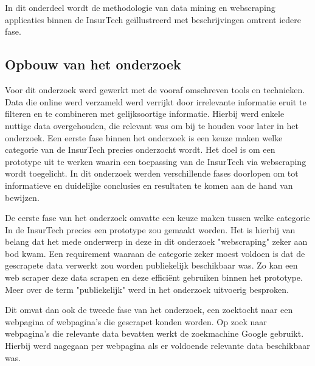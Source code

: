 
\chapter{}
\label{ch:methodologie}


In dit onderdeel wordt de methodologie van data mining en webscraping applicaties binnen de InsurTech geïllustreerd met beschrijvingen omtrent iedere fase.

\section{Opbouw van het onderzoek}
Voor dit onderzoek werd gewerkt met de vooraf omschreven tools en technieken.
Data die online werd verzameld werd verrijkt door irrelevante informatie eruit te filteren en te combineren met gelijksoortige informatie. Hierbij werd enkele nuttige data overgehouden, die relevant was om bij te houden voor later in het onderzoek.
Een eerste fase binnen het onderzoek is een keuze maken welke categorie van de InsurTech precies onderzocht wordt. Het doel is om een prototype uit te werken waarin een toepassing van de InsurTech via webscraping wordt toegelicht.
In dit onderzoek werden verschillende fases doorlopen om tot informatieve en duidelijke conclusies en resultaten te komen aan de hand van bewijzen.

De eerste fase van het onderzoek omvatte een keuze maken tussen welke categorie In de InsurTech precies een prototype zou gemaakt worden. Het is hierbij van belang dat het mede onderwerp in deze in dit onderzoek "webscraping" zeker aan bod kwam. Een requirement waaraan de categorie zeker moest voldoen is dat de gescrapete data verwerkt zou worden publiekelijk beschikbaar was. 
Zo kan een web scraper deze data scrapen en deze efficiënt gebruiken binnen het prototype. 
Meer over de term "publiekelijk" werd in het onderzoek uitvoerig besproken.

Dit omvat dan ook de tweede fase van het onderzoek, een zoektocht naar een webpagina of webpagina's die gescrapet konden worden.
Op zoek naar webpagina's die relevante data bevatten werkt de zoekmachine Google gebruikt. Hierbij werd nagegaan per webpagina als er voldoende relevante data beschikbaar was.

